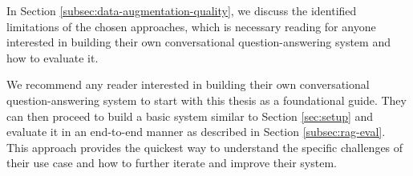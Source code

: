 In Section \ref{subsec:data-augmentation-quality}, we discuss the identified limitations of the chosen approaches, which is necessary reading for anyone interested in building their own conversational question-answering system and how to evaluate it.

\vspace{\baselineskip}
\noindent We recommend any reader interested in building their own conversational question-answering system to start with this thesis as a foundational guide. They can then proceed to build a basic system similar to Section \ref{sec:setup} and evaluate it in an end-to-end manner as described in Section \ref{subsec:rag-eval}. This approach provides the quickest way to understand the specific challenges of their use case and how to further iterate and improve their system.

